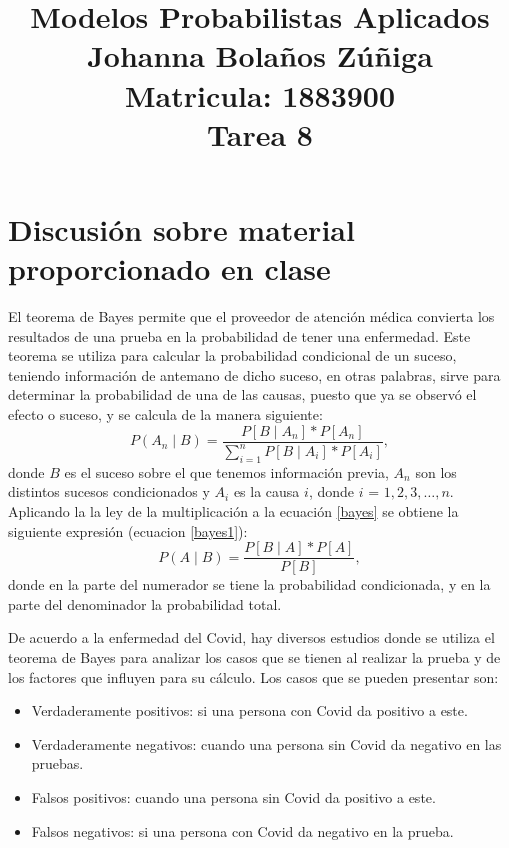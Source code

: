 \documentclass{article}
\title{
\centering
Modelos Probabilistas Aplicados \\
Johanna Bolaños Zúñiga \\
Matricula: 1883900\\
Tarea 8
}
\date{}
\begin{document}
\maketitle

\section{Discusión sobre material proporcionado en clase}
El teorema de Bayes permite que el proveedor de atención médica convierta los resultados de una prueba en la probabilidad de tener una enfermedad. Este teorema se utiliza para calcular la probabilidad condicional de un suceso, teniendo información de antemano de dicho suceso, en otras palabras, sirve para determinar la probabilidad de una de las causas, puesto que ya se observó el efecto o suceso, y se calcula de la manera siguiente:
\begin{equation}
P(A_{n} \mid B)= \frac{P[B \mid A_{n}]*P[A_{n}]}{\sum_{i=1}^{n}P[B \mid A_{i}]*P[A_{i}]},
\label{bayes}
\end{equation}
\noindent donde $B$ es el suceso sobre el que tenemos información previa, $A_{n}$ son los distintos sucesos condicionados y $A_{i}$ es la causa $i$, donde $i$ = $1, 2, 3, \dots , n$. Aplicando la la ley de la multiplicación a la ecuación \ref{bayes} se obtiene la siguiente expresión (ecuacion \ref{bayes1}):
\begin{equation}
P(A \mid B)= \frac{P[B \mid A]*P[A]}{P[B]},
\label{bayes1}
\end{equation}
\noindent donde en la parte del numerador se tiene la probabilidad condicionada, y en la parte del denominador la probabilidad total. 

De acuerdo a la enfermedad del Covid, hay diversos estudios donde se utiliza el teorema de Bayes para analizar los casos que se tienen al realizar la prueba y de los factores que influyen para su cálculo. Los casos que se pueden presentar son:

\begin{itemize}
    \item Verdaderamente positivos: si una persona con Covid da positivo a este.
    \item Verdaderamente negativos: cuando una persona sin Covid da negativo en las pruebas.
    \item Falsos positivos: cuando una persona sin Covid da positivo a este.
    \item Falsos negativos: si una persona con Covid da negativo en la prueba.
\end{itemize}
\end{document}
